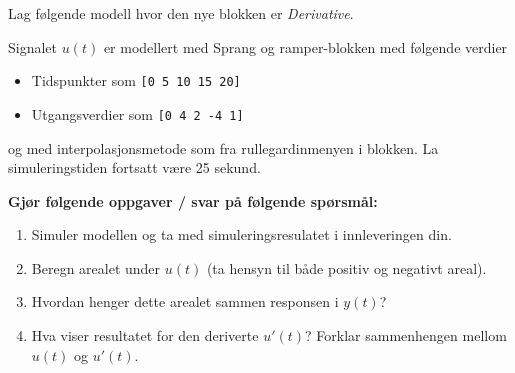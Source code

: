 
\item
  Lag følgende modell hvor den nye blokken er {\it  Derivative}. 
  \begin{figure}[H]
    \centering
    \hspace*{0mm}
  \end{figure}
  Signalet $u(t)$ er modellert med {\sf Sprang og ramper}-blokken
  med følgende verdier
  \begin{itemize}
  \item   {\sf Tidspunkter} som {\tt [0~5~10~15~20]}
    \item {\sf Utgangsverdier} som {\tt [0~4~2~-4~1]} 
  \end{itemize}
  og med interpolasjonsmetode som  fra
    rullegardinmenyen i blokken.  
  {\color{red}La simuleringstiden fortsatt være 25 sekund.}

    {\bf Gjør følgende oppgaver / svar på følgende spørsmål:    }
  
  \begin{enumerate}[label=e\arabic*)]
    \setlength\itemsep{0mm}
    \item   Simuler modellen og ta med simuleringsresulatet
    i innleveringen din. 
  \item Beregn arealet under $u(t)$ (ta hensyn til både positiv og
    negativt areal).
  \item Hvordan henger dette arealet sammen responsen i $y(t)$?
  \item Hva viser resultatet for den deriverte $u'(t)$? 
    Forklar sammenhengen mellom $u(t)$ og $u'(t)$.
  \end{enumerate}
   
